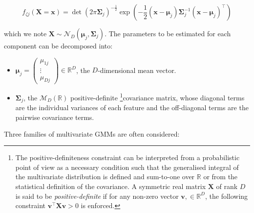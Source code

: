 \begin{equation}
    f_{\zeta j}(\boldsymbol{X}=\boldsymbol{x})=\operatorname{det}(2\pi\boldsymbol{\Sigma}_j)^{-\frac{1}{2}} \exp\left( -\frac{1}{2} (\boldsymbol{x} - \boldsymbol{\mu}_j) \boldsymbol{\Sigma}_j^{-1} (\boldsymbol{x} - \boldsymbol{\mu}_j)^\top\right)
\label{eq:multivariate-distribution}
\end{equation}

which we note
\(\boldsymbol{X} \sim \mathcal{N}_D(\boldsymbol{\mu}_j, \boldsymbol{\Sigma}_j)\). The parameters to be estimated for each component can be decomposed into:

\begin{itemize}
\item
  \(\boldsymbol{\mu}_j=\begin{pmatrix} \mu_{1j} \\ \vdots \\ \mu_{Dj} \end{pmatrix} \in \mathbb{R}^D\), the \(D\)-dimensional mean vector.
\item
  \(\boldsymbol{\Sigma}_j\), the \(\mathcal{M}_D(\mathbb{R})\) positive-definite \footnote{The positive-definiteness constraint can be interpreted from a probabilistic point of view as a necessary condition such that the generalised integral of the multivariate distribution is defined and sum-to-one over \(\mathbb{R}\) or from the statistical definition of the covariance. A symmetric real matrix \(\boldsymbol{X}\) of rank \(D\) is said to be \emph{positive-definite} if for any non-zero vector
    \(\mathbf{v}, \in \mathbb{R}^D\), the following constraint
    \(\mathbf{v}^\top \boldsymbol{X} \mathbf{v} > 0\) is enforced.}covariance matrix, whose diagonal terms are the individual variances of each feature and the off-diagonal terms are the pairwise covariance terms.
\end{itemize}

Three families of multivariate GMMs are often considered:

